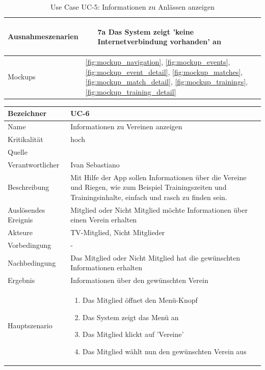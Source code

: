 \begin{table}[ht]
\begin{tabular}{ l | p{10cm} }
					\\ \hline
	Ausnahmeszenarien&	\begin{enumerate}
					\item[7a] Das System zeigt 'keine Internetverbindung vorhanden' an
					\end{enumerate}
					\\ \hline
	Mockups	 	&	\ref{fig:mockup_navigation}, \ref{fig:mockup_events}, \ref{fig:mockup_event_detail},
					\ref{fig:mockup_matches}, \ref{fig:mockup_match_detail}, \ref{fig:mockup_trainings}, 
					\ref{fig:mockup_training_detail}
  \end{tabular}
   \caption{Use Case UC-5: Informationen zu Anlässen anzeigen}\label{table:use_case_5}
\end{table}


\begin{table}[ht]
\centering
  \begin{tabular}{ l | p{10cm} }
	\hline
	\rowcolor{gray}
	Bezeichner		&	UC-6\\ \hline
	Name			&	Informationen zu Vereinen anzeigen\\ \hline
	Kritikalität		&	hoch\\ \hline
	Quelle			&	\glossarmark{Stakeholder}\\ \hline
	Verantwortlicher	&	Ivan Sebastiano\\ \hline
	Beschreibung	&	Mit Hilfe der App sollen Informationen über die Vereine und Riegen, wie zum Beispiel Trainingszeiten und Trainingsinhalte, einfach und rasch zu finden sein.\\ \hline
	Auslösendes Ereignis&	Mitglied oder Nicht Mitglied möchte Informationen über einen Verein erhalten\\ \hline
	Akteure		&	TV-Mitglied, Nicht Mitglieder\\ \hline
	Vorbedingung	&	-\\ \hline
	Nachbedingung	&	Das Mitglied oder Nicht Mitglied hat die gewünschten Informationen erhalten\\ \hline
	Ergebnis		&	Informationen über den gewünschten Verein\\ \hline
	Hauptszenario	&	\begin{enumerate}
					\item Das Mitglied öffnet den Menü-Knopf
					\item Das System zeigt das Menü an
					\item Das Mitglied klickt auf 'Vereine'
					\item Das Mitglied wählt nun den gewünschten Verein aus

\end{enumerate}
\end{tabular}
\end{table}
